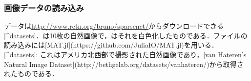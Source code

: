 \subsubsection{画像データの読み込み}データは\url{http://www.rctn.org/bruno/sparsenet/}からダウンロードできる [^datasets]．は10枚の自然画像で，はそれを白色化したものである．ファイルの読み込みには[MAT.jl](https://github.com/JuliaIO/MAT.jl)を用いる．
[^datasets]: これはアメリカ北西部で撮影された自然画像であり，[van Hateren's Natural Image Dataset](http://bethgelab.org/datasets/vanhateren/)から取得されたものである．